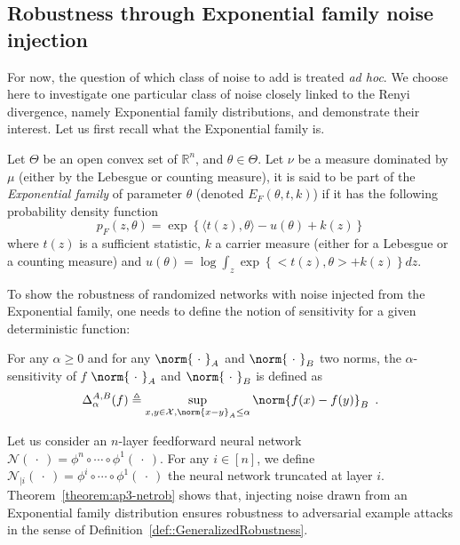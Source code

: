 \subsection{Robustness through Exponential family noise injection}

For now, the question of which class of noise to add is treated \textit{ad hoc}.
We choose here to investigate one particular class of noise closely linked to the Renyi divergence, namely Exponential family distributions, and demonstrate their interest.
Let us first recall what the Exponential family is.

\begin{definition}
  Let $\Theta$ be an open convex set of $\mathbb{R}^{n}$, and $\theta \in \Theta$.
  Let $\nu$ be a measure dominated by $\mu$ (either by the Lebesgue or counting measure), it is said to be part of the \emph{Exponential family} of parameter $\theta$ (denoted $E_{F}(\theta,t,k)$) if it has the following probability density function 
  \begin{equation}
    p_{F}(z,\theta)=\exp\left\{ \langle t(z),\theta \rangle -u(\theta) +k(z) \right\}
  \end{equation}
  where $t(z)$ is a sufficient statistic, $k$ a carrier measure (either for a Lebesgue or a counting measure) and $u(\theta) = \log \int_{z} \exp\left\{ <t(z),\theta> +k(z) \right\} dz $.
\end{definition}

To show the robustness of randomized networks with noise injected from the Exponential family, one needs to define the notion of sensitivity for a given deterministic function:
\begin{definition}
  For any $\alpha\geq0$ and for any $\norm{\ \cdot\ }_A$ and $\norm{\ \cdot\ }_B$ two norms, the $\alpha$-sensitivity of $f$ \wrt $\norm{\ \cdot\ }_A$ and $\norm{\ \cdot\ }_B$ is defined as
  \begin{equation}
    \Delta^{A,B}_\alpha(f) \triangleq \sup\limits_{ x,y \in \mathcal{X}, \norm{x-y}_{A} \leq \alpha} \norm{f(x) - f(y)}_B \enspace.
  \end{equation}
\end{definition}

Let us consider an  $n$-layer feedforward neural network  $\mathcal{N}(\ \cdot\ ) = \phi^n \circ \cdots \circ \phi^1(\ \cdot\ )$.
For any $i\in\left[n\right]$, we define $\mathcal{N}_{|i}(\ \cdot\ ) = \phi^i\circ \cdots \circ \phi^1(\ \cdot\ )$ the neural network truncated at layer $i$.
Theorem~\ref{theorem:ap3-netrob} shows that, injecting noise drawn from an Exponential family distribution ensures robustness to adversarial example attacks in the sense of Definition~\ref{def::GeneralizedRobustness}.


